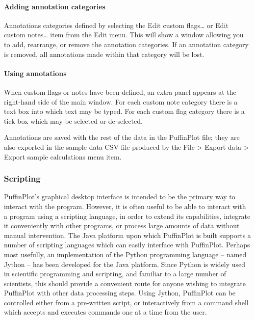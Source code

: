 \documentclass[a4paper,british]{article}
\newcommand{\ppcmd}[1]{\textsf{#1}} %
\newcommand{\caps}[1]{\MakeTextUppercase{#1}} %
\newcommand{\submenu}{ \textgreater{} } %
\begin{document}
\paragraph{Adding annotation categories}

Annotations categories defined by selecting the \ppcmd{Edit custom
  flags\ldots} or \ppcmd{Edit custom notes\ldots} item from the \ppcmd{Edit}
menu. This will show a window allowing you to add, rearrange, or remove the
annotation categories. If an annotation category is removed, all annotations
made within that category will be lost.

\paragraph{Using annotations}

When custom flags or notes have been defined, an extra panel appears at the
right-hand side of the main window. For each custom note category there is a
text box into which text may be typed. For each custom flag category there is
a tick box which may be selected or de-selected.

Annotations are saved with the rest of the data in the PuffinPlot file; they
are also exported in the sample data \caps{csv} file produced by the
\ppcmd{File\submenu Export data\submenu Export sample calculations} menu
item.

\subsubsection{\label{sec:scripting}Scripting}

PuffinPlot's graphical desktop interface is intended to be the primary way to
interact with the program. However, it is often useful to be able to interact
with a program using a scripting language, in order to extend its
capabilities, integrate it conveniently with other programs, or process large
amounts of data without manual intervention. The Java platform upon which
PuffinPlot is built supports a number of scripting languages which can easily
interface with PuffinPlot. Perhaps most usefully, an implementation of the
Python programming language -- named Jython \citep{juneau2009jython} -- has
been developed for the Java platform. Since Python is widely used in
scientific programming and scripting, and familiar to a large number of
scientists, this should provide a convenient route for anyone wishing to
integrate PuffinPlot with other data processing steps. Using Jython,
PuffinPlot can be controlled either from a pre-written script, or
interactively from a command shell which accepts and executes commands one at
a time from the user.
\end{document}
